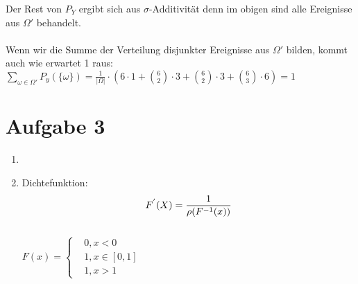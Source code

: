 \documentclass[10pt,a4paper]{article}
\begin{document}
\begin{enumerate}[a)]
Der Rest von $P_Y$ ergibt sich aus $\sigma$-Additivität denn im obigen sind alle Ereignisse aus $\Omega'$ behandelt.\\\\
Wenn wir die Summe der Verteilung disjunkter Ereignisse aus $\Omega'$ bilden, kommt auch wie erwartet 1 raus:\\
$\sum_{\omega \in \Omega'} P_y(\{\omega\}) = \frac{1}{|\Omega|} \cdot (6\cdot 1 + \binom{6}{2} \cdot 3 + \binom{6}{2} \cdot 3 + \binom{6}{3} \cdot 6) = 1$



\end{enumerate}


\newpage
\section*{Aufgabe 3}
\begin{enumerate}
    \item 
    \item Dichtefunktion:
    \begin{equation}
        F^{'}(X) = \frac{1}{\rho(F^{-1}(x))} \notag 
    \end{equation}\\
    $F(x) =  \left \{
          \begin{aligned}
           &0, x < 0 \\
           &1, x \in [0,1]\\
           &1, x > 1
          \end{aligned}\right.$  \notag
\end{enumerate}

\newpage
\end{document}
